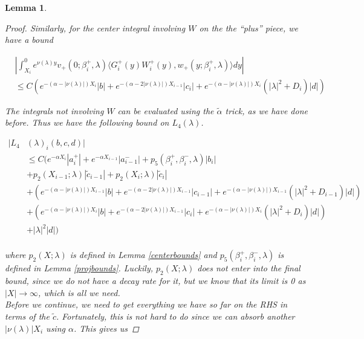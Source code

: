 \documentclass[12pt]{article}
\newtheorem{lemma}{Lemma}
\begin{document}
\begin{lemma}
\begin{proof}
Similarly, for the center integral involving $W$ on the the ``plus'' piece, we have a bound

\begin{align*}
&\left| \int_{X_i}^0 e^{\nu(\lambda)y} v_+(0; \beta_i^+, \lambda) \langle G_i^+(y)W_i^+(y), w_+(y; \beta_i^+, \lambda) \rangle dy \right| \\
&\leq C ( e^{-(\alpha - |\nu(\lambda)|) X_i} |b| + e^{-(\alpha - 2 |\nu(\lambda)|) X_{i-1}}|c_i| + e^{-(\alpha - |\nu(\lambda)|) X_i} (|\lambda|^2 + D_i)|d| )
\end{align*}

The integrals not involving $W$ can be evaluated using the $\tilde{\alpha}$ trick, as we have done before. Thus we have the following bound on $L_4(\lambda)$. 

\begin{align*}
|L_4&(\lambda)_i(b, c, d)|\\ 
&\leq C \Big( e^{-\alpha X_i} |a_i^+| +  e^{-\alpha X_{i-1}} |a_{i-1}^-| + p_5(\beta_i^+, \beta_i^-, \lambda) |b_i| \\
&+ p_2(X_{i-1}; \lambda) |\tilde{c}_{i-1}| + p_2(X_i; \lambda) |\tilde{c}_i| \\
&+ ( e^{-(\alpha - |\nu(\lambda)|) X_{i-1}} |b| + e^{-(\alpha - 2 |\nu(\lambda)|) X_{i-1}}|c_{i-1}| + e^{-(\alpha - |\nu(\lambda)|) X_{i-1}} (|\lambda|^2 + D_{i-1})|d| ) \\
&+ ( e^{-(\alpha - |\nu(\lambda)|) X_i} |b| + e^{-(\alpha - 2 |\nu(\lambda)|) X_{i-1}}|c_i| + e^{-(\alpha - |\nu(\lambda)|) X_i} (|\lambda|^2 + D_i)|d| )  \\
&+ |\lambda|^2 |d| \Big)\\
\end{align*}

where $p_2(X; \lambda)$ is defined in Lemma \ref{centerbounds} and $p_5(\beta_i^+, \beta_i^-, \lambda)$ is defined in Lemma \ref{projbounds}. Luckily, $p_2(X; \lambda)$ does not enter into the final bound, since we do not have a decay rate for it, but we know that its limit is 0 as $|X| \rightarrow \infty$, which is all we need.\\

Before we continue, we need to get everything we have so far on the RHS in terms of the $\tilde{c}$. Fortunately, this is not hard to do since we can absorb another $|\nu(\lambda)|X_i$ using $\alpha$. This gives us


\end{proof}
\end{lemma}
\end{document}
